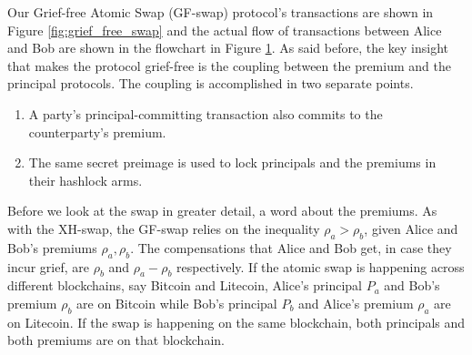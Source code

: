 \begin{figure}
\label{fig:grief_free_swap_flow_chart}    
\end{figure}

Our Grief-free Atomic Swap (GF-swap) protocol's transactions are shown in Figure \ref{fig:grief_free_swap} and the actual flow of transactions between Alice and Bob are shown in the flowchart in Figure \ref{fig:grief_free_swap_flow_chart}. As said before, the key insight that makes the protocol grief-free is the coupling between the premium and the principal protocols. The coupling is accomplished in two separate points.
\begin{enumerate}
    \item A party's principal-committing transaction also commits to the counterparty's premium.
    \item The same secret preimage is used to lock principals and the premiums in their hashlock arms.
\end{enumerate}

Before we look at the swap in greater detail, a word about the premiums. As with the XH-swap, the GF-swap relies on the inequality $\rho_a > \rho_b$, given Alice and Bob's premiums $\rho_a, \rho_b$. The compensations that Alice and Bob get, in case they incur grief, are $\rho_b$ and $\rho_a - \rho_b$ respectively. If the atomic swap is happening across different blockchains, say Bitcoin and Litecoin, Alice's principal $P_a$ and Bob's premium $\rho_b$ are on Bitcoin while Bob's principal $P_b$ and Alice's premium $\rho_a$ are on Litecoin. If the swap is happening on the same blockchain, both principals and both premiums are on that blockchain.

